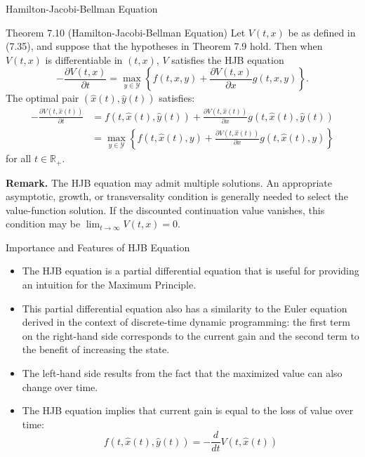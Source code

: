 \documentclass[9pt,aspectratio=169]{beamer}
\newcommand{\Y}{\mathcal{Y}}
\begin{document}
\begin{frame}{Hamilton-Jacobi-Bellman Equation}
\begin{block}{Theorem 7.10 (Hamilton-Jacobi-Bellman Equation)}
    Let $V(t, x)$ be as defined in (7.35), and suppose that the hypotheses in
    Theorem 7.9 hold. Then when $V(t, x)$ is differentiable in $(t, x)$, $V$
    satisfies the HJB equation
    \begin{equation*}
        -\frac{\partial V(t, x)}{\partial t} = \max_{y \in \Y} \left\{ f(t, x,
              y) + \frac{\partial V(t, x)}{\partial x} g(t, x, y) \right\}.
    \end{equation*}
    The optimal pair $(\hat{x}(t), \hat{y}(t))$ satisfies:
    \begin{align*}
        -\frac{\partial V(t, \hat{x}(t))}{\partial t} &= f(t, \hat{x}(t),
        \hat{y}(t)) + \frac{\partial V(t, \hat{x}(t))}{\partial x} g(t,
        \hat{x}(t), \hat{y}(t)) \\
        &= \max_{y \in \Y} \left\{f(t, \hat{x}(t), y) + \frac{\partial V(t,
              \hat{x}(t))}{\partial x} g(t, \hat{x}(t), y) \right\}
    \end{align*}
    for all $t \in \mathbb{R}_+$.
\end{block}
\textbf{Remark.} The HJB equation may admit multiple solutions. An appropriate
asymptotic, growth, or transversality condition is generally needed to select
the value-function solution. If the discounted continuation value vanishes,
this condition may be $\lim_{t\to\infty}V(t,x)=0$.
\end{frame}

\begin{frame}{Importance and Features of HJB Equation}
\begin{itemize}
    \item The HJB equation is a partial differential equation that is useful
    for providing an intuition for the Maximum Principle.
    \item This partial differential equation also has a similarity to the
    Euler equation derived in the context of discrete-time dynamic
    programming: the first term on the right-hand side corresponds to the
    current gain and the second term to the benefit of increasing the state.
    \item The left-hand side results from the fact that the maximized value
    can also change over time.
    \item The HJB equation implies that current gain is equal to the loss of
    value over time:
    \begin{equation*}
        f(t, \hat x(t), \hat y(t)) = -\frac{d}{dt}V(t, \hat x(t))
    \end{equation*}
\end{itemize}
\end{frame}
\end{document}
